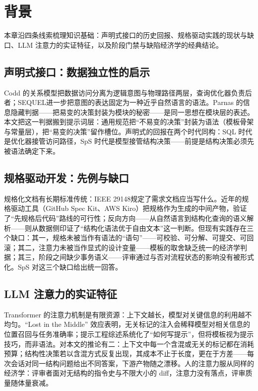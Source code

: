 \documentclass[11pt,a4paper]{ctexart}
\begin{document}
\section{背景}
本章沿四条线索梳理知识基础：声明式接口的历史回报、规格驱动实践的现状与缺口、LLM 注意力的实证特征，以及阶段门禁与缺陷经济学的经典结论。

\subsection{声明式接口：数据独立性的启示}
Codd 的关系模型\cite{ref3}把数据访问分离为逻辑意图与物理路径两层，查询优化器负责后者；SEQUEL\cite{ref4}进一步把意图的表达固定为一种近乎自然语言的语法。Parnas 的信息隐藏判据\cite{ref5}——把易变的决策封装为模块的秘密——是同一思想在模块层的表述。本文把这一判据搬到提示词层：通用规范把“不易变的决策”封装为语法（模板骨架与常量层），把“易变的决策”留作槽位。声明式的回报在两个时代同构：SQL 时代是优化器接管访问路径，SpS 时代是模型接管结构决策——前提是结构决策必须先被语法确定下来。

\subsection{规格驱动开发：先例与缺口}
规格化文档有长期标准传统：IEEE 29148\cite{ref17}规定了需求文档应当写什么。近年的规格驱动工具（GitHub Spec Kit\cite{ref18}、AWS Kiro\cite{ref19}）把规格作为生成的中间产物，验证了“先规格后代码”路线的可行性；反向方向——从自然语言到结构化查询的语义解析\cite{ref16}——则从数据侧印证了“结构化语法优于自由文本”这一判断。但现有实践存在三个缺口：其一，规格未被当作有语法的“语句”——可校验、可分解、可提交、可回滚；其二，注意力未被当作显式的设计变量——模板的取舍缺乏统一的经济学判据；其三，阶段之间缺少事务语义——评审通过与否对流程状态的影响没有被形式化。SpS 对这三个缺口给出统一回答。

\subsection{LLM 注意力的实证特征}
Transformer 的注意力机制\cite{ref10}是有限资源：上下文越长，模型对关键信息的利用越不均匀。“Lost in the Middle” 效应\cite{ref11}表明，无关标记的注入会稀释模型对相关信息的位置召回与任务准确率；提示工程综述\cite{ref12}系统化了“如何写提示”，但将模板视为提示技巧，而非语法。对本文的推论有二：上下文中每一个含混或无关的标记都在消耗预算；结构性决策若以含混方式反复出现，其成本不止于长度，更在于方差——每次会话对同一结构问题给出不同答案，下游产物随之漂移。人的注意力服从同样的经济学：评审者面对无结构的指令史与不限大小的 diff，注意力没有落点，评审质量随体量衰减。
\end{document}
